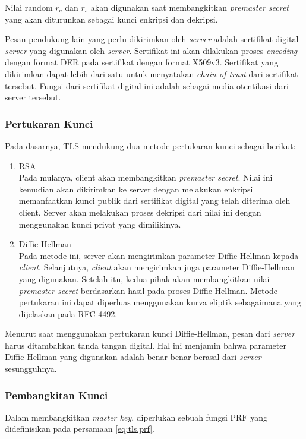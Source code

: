 Nilai random $r_c$ dan $r_s$ akan digunakan saat membangkitkan \emph{premaster secret} yang akan diturunkan sebagai kunci enkripsi dan dekripsi.

Pesan pendukung lain yang perlu dikirimkan oleh \emph{server} adalah sertifikat digital \emph{server} yang digunakan oleh \emph{server}. Sertifikat ini akan dilakukan proses \emph{encoding} dengan format DER pada sertifikat dengan format X509v3. Sertifikat yang dikirimkan dapat lebih dari satu untuk menyatakan \emph{chain of trust} dari sertifikat tersebut. Fungsi dari sertifikat digital ini adalah sebagai media otentikasi dari server tersebut.


\subsubsection{Pertukaran Kunci}
\label{sec:tls.keyexchange}

Pada dasarnya, TLS mendukung dua metode pertukaran kunci sebagai berikut:
\begin{enumerate}
  \item RSA\\
  Pada mulanya, client akan membangkitkan \emph{premaster secret}. Nilai ini kemudian akan dikirimkan ke server dengan melakukan enkripsi memanfaatkan kunci publik dari sertifikat digital yang telah diterima oleh client. Server akan melakukan proses dekripsi dari nilai ini dengan menggunakan kunci privat yang dimilikinya.

  \item Diffie-Hellman\\
  Pada metode ini, server akan mengirimkan parameter Diffie-Hellman kepada \emph{client}. Selanjutnya, \emph{client} akan mengirimkan juga parameter Diffie-Hellman yang digunakan. Setelah itu, kedua pihak akan membangkitkan nilai \emph{premaster secret} berdasarkan hasil pada proses Diffie-Hellman. Metode pertukaran ini dapat diperluas menggunakan kurva eliptik sebagaimana yang dijelaskan pada RFC 4492. 
\end{enumerate}

Menurut \textcite{rfc5246} saat menggunakan pertukaran kunci Diffie-Hellman, pesan dari \emph{server} harus ditambahkan tanda tangan digital. Hal ini menjamin bahwa parameter Diffie-Hellman yang digunakan adalah benar-benar berasal dari \emph{server} sesungguhnya. 

\subsubsection{Pembangkitan Kunci}
Dalam membangkitkan \emph{master key}, diperlukan sebuah fungsi $\text{PRF}$ yang didefinisikan pada persamaan \ref{eq:tls.prf}.

